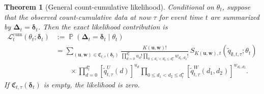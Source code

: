 \documentclass{article}
\newtheorem{theorem}{Theorem}
\theoremstyle{definition}
\theoremstyle{remark}
\newcommand{\Prb}{\operatorname{\mathbb{P}}}
\begin{document}
\begin{theorem}[General count-cumulative likelihood]\label{thm:generalcum}
Conditional on $\theta_t$, suppose that the observed count-cumulative data at now $\tau$ for event time $t$ are summarized by $\boldsymbol\Delta_t=\boldsymbol\delta_t$. Then the exact likelihood contribution is
\begin{equation}\label{generalcumlik}
\begin{split}
    \mathcal L_t^{\mathrm{cum}}(\theta_t;\boldsymbol\delta_t)
    &:={}
    \Prb(\boldsymbol\Delta_t=\boldsymbol\delta_t\mid\theta_t)\\
    &=
    \sum_{(\boldsymbol u,\boldsymbol w)\in
    \mathfrak C_{t,\tau}(\boldsymbol\delta_t)}
    \frac{K(\boldsymbol u,\boldsymbol w)!}
    {
    \displaystyle\prod_{d=0}^{d_t^{\star}}u_d!
    \displaystyle\prod_{0\leq d_1<d_2\leq d_t^{\star}}w_{d_1,d_2}!}
    \,
    S_{K(\boldsymbol u,\boldsymbol w),t}
    \left(\tilde q_{\emptyset,t,\tau};\theta_t\right)\\
    &\qquad\times
    \prod_{d=0}^{d_t^{\star}}
    \left[\tilde q_{t,\tau}^{U}(d)\right]^{u_d}
    \prod_{0\leq d_1<d_2\leq d_t^{\star}}
    \left[\tilde q_{t,\tau}^{W}(d_1,d_2)\right]^{w_{d_1,d_2}}.
\end{split}
\end{equation}
If $\mathfrak C_{t,\tau}(\boldsymbol\delta_t)$ is empty, the likelihood is zero. 


\end{theorem}
\end{document}
